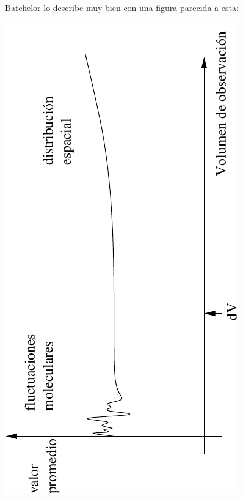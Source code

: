 Batchelor \cite{Bat} lo describe muy bien con una figura parecida a esta:
\begin{center}
\includegraphics[scale=1,angle=270]{TeX_files/chapter01-Introduccion/difer_vol.pdf}
\end{center}


